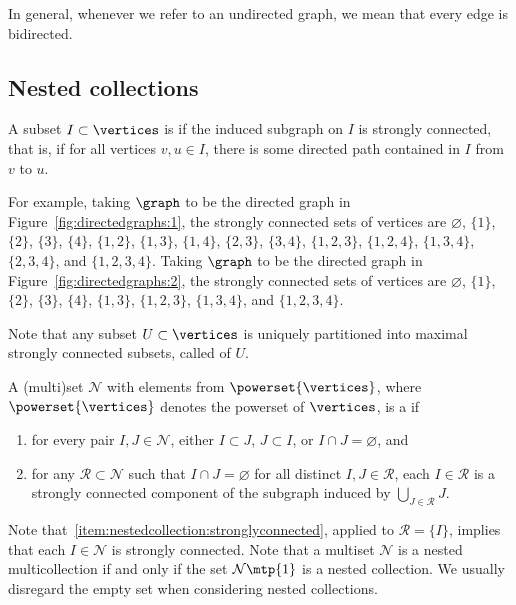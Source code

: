In general, whenever we refer to an undirected graph, we mean that every edge is bidirected. 

\subsection{Nested collections} \label{subsection:nestedcollections}

A subset \(I \subset \vertices\) is  if the induced subgraph on \(I\) is strongly connected, that is, if for all vertices \(v, u \in I\), there is some directed path contained in \(I\) from \(v\) to \(u\).

For example,
taking \(\graph\) to be the directed graph in Figure~\ref{fig:directedgraphs:1},
the strongly connected sets of vertices are \(\varnothing\), \(\{1\}\), \(\{2\}\), \(\{3\}\), \(\{4\}\), \(\{1, 2\}\), \(\{1, 3\}\), \(\{1, 4\}\), \(\{2, 3\}\), \(\{3, 4\}\), \(\{1, 2, 3\}\), \(\{1, 2, 4\}\), \(\{1, 3, 4\}\), \(\{2, 3, 4\}\), and \(\{1, 2, 3, 4\}\).
Taking \(\graph\) to be the directed graph in Figure~\ref{fig:directedgraphs:2},
the strongly connected sets of vertices are \(\varnothing\), \(\{1\}\), \(\{2\}\), \(\{3\}\), \(\{4\}\), \(\{1, 3\}\), \(\{1, 2, 3\}\), \(\{1, 3, 4\}\), and \(\{1, 2, 3, 4\}\).

Note that any subset \(U \subset \vertices\) is uniquely partitioned into maximal strongly connected subsets, called  of \(U\).

A (multi)set \(\mathcal{N}\) with elements from \(\powerset{\vertices}\), where \(\powerset{\vertices}\) denotes the powerset of \(\vertices\),
is a  if
\begin{enumerate}[label = (N\arabic*), ref = (N\arabic*), leftmargin = .6in]
    \item \label{item:nestedcollection:disjoint}
    for every pair \(I, J \in \mathcal{N}\),
    either \(I \subset J\), \(J \subset I\), or \(I \cap J = \varnothing\), and
    \item \label{item:nestedcollection:stronglyconnected}
    for any \(\mathcal{R} \subset \mathcal{N}\) such that \(I \cap J = \varnothing\) for all distinct \(I, J \in \mathcal{R}\),
    each \(I \in \mathcal{R}\) is a strongly connected component of the subgraph induced by \(\bigcup_{J \in \mathcal{R}} J\).
\end{enumerate}

Note that~\ref{item:nestedcollection:stronglyconnected}, applied to \(\mathcal{R} = \{I\}\), implies that each \(I \in \mathcal{N}\) is strongly connected.
Note that a multiset \(\mathcal{N}\) is a nested multicollection if and only if the set \(\mathcal{N}\mtp{1}\) is a nested collection.
We usually disregard the empty set when considering nested collections.

